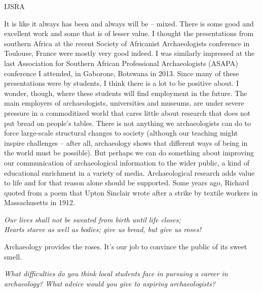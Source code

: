 \begin{labeling}{IJSRA}
\item[GW]
It is like it always has been and always will be – mixed. There is some good and excellent work and some that is of lesser value. I thought the presentations from southern Africa at the recent Society of Africanist Archaeologists conference in Toulouse, France were mostly very good indeed. I was similarly impressed at the last Association for Southern African Professional Archaeologists (ASAPA) conference I attended, in Gaborone, Botswana in 2013. Since many of these presentations were by students, I think there is a lot to be positive about. I wonder, though, where these students will find employment in the future. The main employers of archaeologists, universities and museums, are under severe pressure in a commoditized world that cares little about research that does not put bread on people’s tables. There is not anything we archaeologists can do to force large-scale structural changes to society (although our teaching might inspire challenges – after all, archaeology shows that different ways of being in the world must be possible). But perhaps we can do something about improving our communication of archaeological information to the wider public, a kind of educational enrichment in a variety of media. Archaeological research adds value to life and for that reason alone should be supported. 
Some years ago, Richard \textcite{Pithouse2010} quoted from a poem that Upton Sinclair wrote after a strike by textile workers in Massachusetts in 1912.
\begin{center}
\itshape	Our lives shall not be sweated from birth until life closes;\\
	Hearts starve as well as bodies; give us bread, but give us roses!
\end{center}
Archaeology provides the roses. It’s our job to convince the public of its sweet smell.

\item[IJSRA] \emph{What difficulties do you think local students face in pursuing a career in archaeology? What advice would you give to aspiring archaeologists?}
	

\end{labeling}
